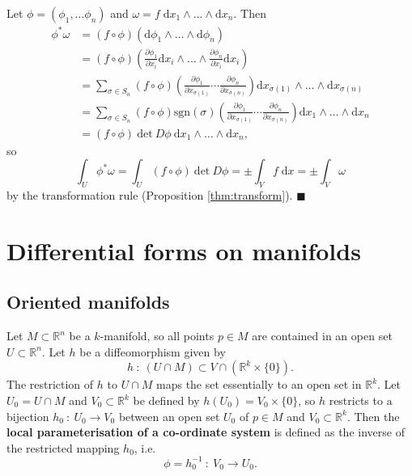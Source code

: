 \documentclass[letter-paper]{tufte-book}
\newenvironment{proof}[1][Proof]{\begin{trivlist}
\item[\hskip \labelsep {\bfseries #1}]}{\end{trivlist}}
\newcommand{\qed}{\hfill$\blacksquare$}
\begin{document}
\begin{proof}
  Let $\phi = (\phi_1, \ldots \phi_n)$ and $\omega = f\; \mathrm{d}x_1 \wedge \ldots \wedge \mathrm{d}x_n$. Then
  \begin{align*}
    \phi^*\omega 
      &= (f\circ\phi)(\mathrm{d}\phi_1 \wedge \ldots \wedge \mathrm{d}\phi_n)\\
      &= (f\circ\phi)\left(\frac{\partial \phi_1}{\partial x_i}\mathrm{d}x_i \wedge \ldots \wedge \frac{\partial \phi_n}{\partial x_i}\mathrm{d}x_i\right)\\
      &= \sum_{\sigma\in S_n} (f\circ\phi) \left(\frac{\partial \phi_1}{\partial x_{\sigma(1)}} \cdots \frac{\partial \phi_n}{\partial x_{\sigma(n)}} \right)\mathrm{d}x_{\sigma(1)} \wedge \ldots \wedge \mathrm{d}x_{\sigma(n)}\\
      &= \sum_{\sigma\in S_n} (f\circ\phi) \mbox{sgn}(\sigma) \left(\frac{\partial \phi_1}{\partial x_{\sigma(1)}} \cdots \frac{\partial \phi_n}{\partial x_{\sigma(n)}} \right)\mathrm{d}x_1 \wedge \ldots \wedge \mathrm{d}x_n\\
      &= (f\circ\phi)\ \mbox{det}\ D\phi\ \mathrm{d}x_1 \wedge \ldots \wedge \mathrm{d}x_n,
  \end{align*}
  so
  \begin{equation*}
    \int_U \phi^*\omega = \int_U (f\circ\phi)\ \mbox{det}\ D\phi = \pm \int_V f\; \mathrm{d}x = \pm \int_V \omega
  \end{equation*}
  by the transformation rule (Proposition \ref{thm:transform}). \qed
\end{proof}


\chapter{Differential forms on manifolds}


\section{Oriented manifolds}

Let $M \subset \mathbb{R}^n$ be a $k$-manifold, so all points $p \in M$ are contained in an open set $U \subset \mathbb{R}^n$. Let $h$ be a diffeomorphism given by
\begin{equation*}
  h\ :\ (U \cap M) \subset V \cap (\mathbb{R}^k \times \{0\}).
\end{equation*}
The restriction of $h$ to $U \cap M$ maps the set essentially to an open set in $\mathbb{R}^k$. Let $U_0 = U \cap M$ and $V_0 \subset \mathbb{R}^k$ be defined by $h(U_0) = V_0 \times \{0\}$, so $h$ restricts to a bijection $h_0\ :\ U_0 \to V_0$ between an open set $U_0$ of $p \in M$ and $V_0 \subset \mathbb{R}^k$. Then the \textbf{local parameterisation of a co-ordinate system} is defined as the inverse of the restricted mapping $h_0$, i.e.
\begin{equation}
  \phi = h_0^{-1}\ :\ V_0 \to U_0.
\end{equation}
\end{document}
